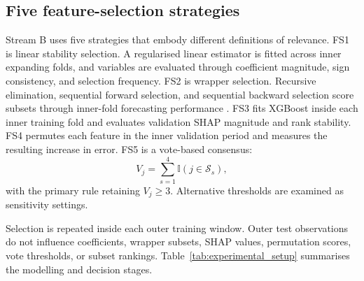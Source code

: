 \documentclass[preprint,12pt]{elsarticle}
\begin{document}
\subsection{Five feature-selection strategies}

Stream B uses five strategies that embody different definitions of relevance. FS1 is linear stability selection. A regularised linear estimator is fitted across inner expanding folds, and variables are evaluated through coefficient magnitude, sign consistency, and selection frequency. FS2 is wrapper selection. Recursive elimination, sequential forward selection, and sequential backward selection score subsets through inner-fold forecasting performance \citep{kohavi1997,guyon2003}. FS3 fits XGBoost inside each inner training fold and evaluates validation SHAP magnitude and rank stability. FS4 permutes each feature in the inner validation period and measures the resulting increase in error. FS5 is a vote-based consensus:
\begin{equation}
 V_j=\sum_{s=1}^{4}\mathbb{I}(j\in\mathcal{S}_s),
\end{equation}
with the primary rule retaining $V_j\geq3$. Alternative thresholds are examined as sensitivity settings.

Selection is repeated inside each outer training window. Outer test observations do not influence coefficients, wrapper subsets, SHAP values, permutation scores, vote thresholds, or subset rankings. Table~\ref{tab:experimental_setup} summarises the modelling and decision stages.
\end{document}
